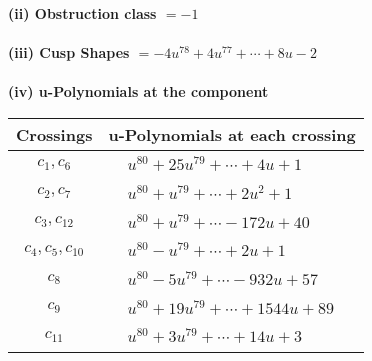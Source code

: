 \documentclass[1p]{elsarticle_modified}
\theoremstyle{definition}
\begin{document}
\flushleft \textbf{(ii) Obstruction class $= -1$}\\~\\
\flushleft \textbf{(iii) Cusp Shapes $= -4 u^{78}+4 u^{77}+\cdots+8 u-2$}\\~\\
\newpage\renewcommand{\arraystretch}{1}
\flushleft \textbf{(iv) u-Polynomials at the component}\newline \\
\begin{tabular}{m{50pt}|m{274pt}}
Crossings & \hspace{64pt}u-Polynomials at each crossing \\
\hline $$\begin{aligned}c_{1},c_{6}\end{aligned}$$&$\begin{aligned}
&u^{80}+25 u^{79}+\cdots+4 u+1
\end{aligned}$\\
\hline $$\begin{aligned}c_{2},c_{7}\end{aligned}$$&$\begin{aligned}
&u^{80}+u^{79}+\cdots+2 u^2+1
\end{aligned}$\\
\hline $$\begin{aligned}c_{3},c_{12}\end{aligned}$$&$\begin{aligned}
&u^{80}+u^{79}+\cdots-172 u+40
\end{aligned}$\\
\hline $$\begin{aligned}c_{4},c_{5},c_{10}\end{aligned}$$&$\begin{aligned}
&u^{80}- u^{79}+\cdots+2 u+1
\end{aligned}$\\
\hline $$\begin{aligned}c_{8}\end{aligned}$$&$\begin{aligned}
&u^{80}-5 u^{79}+\cdots-932 u+57
\end{aligned}$\\
\hline $$\begin{aligned}c_{9}\end{aligned}$$&$\begin{aligned}
&u^{80}+19 u^{79}+\cdots+1544 u+89
\end{aligned}$\\
\hline $$\begin{aligned}c_{11}\end{aligned}$$&$\begin{aligned}
&u^{80}+3 u^{79}+\cdots+14 u+3
\end{aligned}$\\
\hline
\end{tabular}\\~\\
\end{document}
